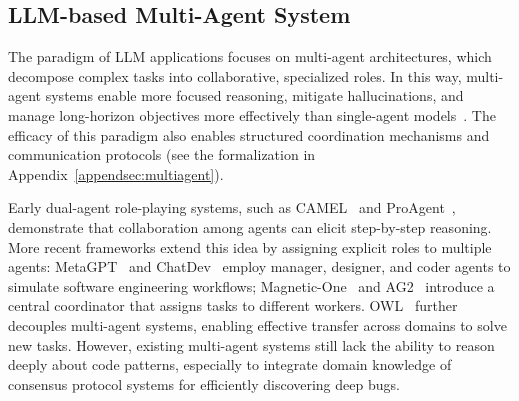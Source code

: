 \documentclass{article}
\theoremstyle{plain}
\theoremstyle{definition}
\theoremstyle{remark}
\begin{document}
\subsection{LLM-based Multi-Agent System}
The paradigm of LLM applications focuses on multi-agent architectures, which decompose complex tasks into collaborative, specialized roles. In this way, multi-agent systems enable more focused reasoning, mitigate hallucinations, and manage long-horizon objectives more effectively than single-agent models~\cite{Chen2023AgentVerseFM,Guo2024LargeLM,Yang2025AgentNetDE}. The efficacy of this paradigm also enables structured coordination mechanisms and communication protocols (see the formalization in Appendix~\ref{appendsec:multiagent}). 

Early dual-agent role-playing systems, such as CAMEL~\cite{Li2023CAMELCA} and ProAgent~\cite{Zhang2023ProAgentBP}, demonstrate that collaboration among agents can elicit step-by-step reasoning. More recent frameworks extend this idea by assigning explicit roles to multiple agents: MetaGPT~\cite{hong2023metagpt} and ChatDev~\cite{Qian2023ChatDevCA} employ manager, designer, and coder agents to simulate software engineering workflows; Magnetic-One~\cite{Fourney2024MagenticOneAG} and AG2~\cite{AG2} introduce a central coordinator that assigns tasks to different workers. OWL~\cite{Hu2025OWLOW} further decouples multi-agent systems, enabling effective transfer across domains to solve new tasks.
However, existing multi-agent systems still lack the ability to reason deeply about code patterns, especially to integrate domain knowledge of consensus protocol systems for efficiently discovering deep bugs.
\end{document}
